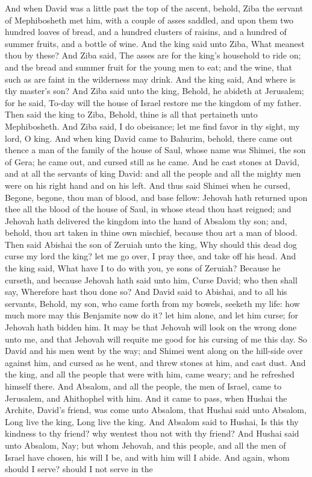 And when David was a little past the top of the ascent, behold, Ziba the servant of Mephibosheth met him, with a couple of asses saddled, and upon them two hundred loaves of bread, and a hundred clusters of raisins, and a hundred of summer fruits, and a bottle of wine. And the king said unto Ziba, What meanest thou by these? And Ziba said, The asses are for the king’s household to ride on; and the bread and summer fruit for the young men to eat; and the wine, that such as are faint in the wilderness may drink. And the king said, And where is thy master’s son? And Ziba said unto the king, Behold, he abideth at Jerusalem; for he said, To-day will the house of Israel restore me the kingdom of my father. Then said the king to Ziba, Behold, thine is all that pertaineth unto Mephibosheth. And Ziba said, I do obeisance; let me find favor in thy sight, my lord, O king.  And when king David came to Bahurim, behold, there came out thence a man of the family of the house of Saul, whose name was Shimei, the son of Gera; he came out, and cursed still as he came. And he cast stones at David, and at all the servants of king David: and all the people and all the mighty men were on his right hand and on his left. And thus said Shimei when he cursed, Begone, begone, thou man of blood, and base fellow: Jehovah hath returned upon thee all the blood of the house of Saul, in whose stead thou hast reigned; and Jehovah hath delivered the kingdom into the hand of Absalom thy son; and, behold, thou art taken in thine own mischief, because thou art a man of blood.  Then said Abishai the son of Zeruiah unto the king, Why should this dead dog curse my lord the king? let me go over, I pray thee, and take off his head. And the king said, What have I to do with you, ye sons of Zeruiah? Because he curseth, and because Jehovah hath said unto him, Curse David; who then shall say, Wherefore hast thou done so? And David said to Abishai, and to all his servants, Behold, my son, who came forth from my bowels, seeketh my life: how much more may this Benjamite now do it? let him alone, and let him curse; for Jehovah hath bidden him. It may be that Jehovah will look on the wrong done unto me, and that Jehovah will requite me good for his cursing of me this day. So David and his men went by the way; and Shimei went along on the hill-side over against him, and cursed as he went, and threw stones at him, and cast dust. And the king, and all the people that were with him, came weary; and he refreshed himself there.  And Absalom, and all the people, the men of Israel, came to Jerusalem, and Ahithophel with him. And it came to pass, when Hushai the Archite, David’s friend, was come unto Absalom, that Hushai said unto Absalom, Long live the king, Long live the king. And Absalom said to Hushai, Is this thy kindness to thy friend? why wentest thou not with thy friend? And Hushai said unto Absalom, Nay; but whom Jehovah, and this people, and all the men of Israel have chosen, his will I be, and with him will I abide. And again, whom should I serve? should I not serve in the 